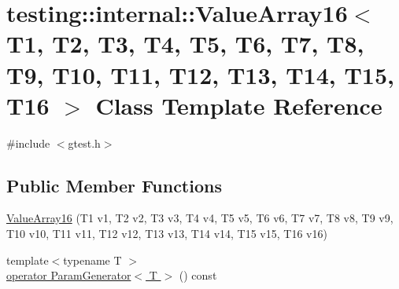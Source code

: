 \hypertarget{classtesting_1_1internal_1_1_value_array16}{\section{testing\-:\-:internal\-:\-:Value\-Array16$<$ T1, T2, T3, T4, T5, T6, T7, T8, T9, T10, T11, T12, T13, T14, T15, T16 $>$ Class Template Reference}
\label{classtesting_1_1internal_1_1_value_array16}
}


{\ttfamily \#include $<$gtest.\-h$>$}

\subsection*{Public Member Functions}
\begin{DoxyCompactItemize}
\item 
\hyperlink{classtesting_1_1internal_1_1_value_array16_ac12b3a15ab5418665a97b4a225438529}{Value\-Array16} (T1 v1, T2 v2, T3 v3, T4 v4, T5 v5, T6 v6, T7 v7, T8 v8, T9 v9, T10 v10, T11 v11, T12 v12, T13 v13, T14 v14, T15 v15, T16 v16)
\item 
{\footnotesize template$<$typename T $>$ }\\\hyperlink{classtesting_1_1internal_1_1_value_array16_a66c4563520a0edf203e0c1eaba521db4}{operator Param\-Generator$<$ T $>$} () const 
\end{DoxyCompactItemize}


